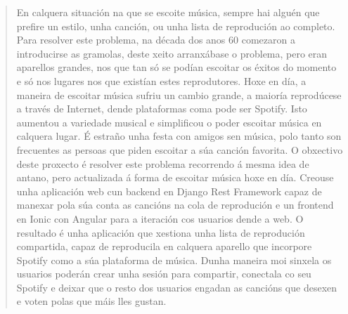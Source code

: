 
\begin{abstract}\thispagestyle{empty}
	En calquera situación na que se escoite música, sempre hai alguén que prefire un estilo, unha canción, ou unha lista de reprodución ao completo. Para resolver este problema, na década dos anos 60 comezaron a introducirse as gramolas, deste xeito arranxábase o problema, pero eran aparellos grandes, nos que tan só se podían escoitar os éxitos do momento e só nos lugares nos que existían estes reprodutores. Hoxe en día, a maneira de escoitar música sufriu un cambio grande, a maioría reprodúcese a través de Internet, dende plataformas coma pode ser Spotify. Isto aumentou a variedade musical e simplificou o poder escoitar música en calquera lugar. É estraño unha festa con amigos sen música, polo tanto son frecuentes as persoas que piden escoitar a súa canción favorita.\smallbreak
	O obxectivo deste proxecto é resolver este problema recorrendo á mesma idea de antano, pero actualizada á forma de escoitar música hoxe en día. Creouse unha aplicación web cun backend en Django Rest Framework capaz de manexar pola súa conta as cancións na cola de reprodución e un frontend en Ionic con Angular para a iteración cos usuarios dende a web.\smallbreak
	O resultado é unha aplicación que xestiona unha lista de reprodución compartida, capaz de reproducila en calquera aparello que incorpore Spotify como a súa plataforma de música. Dunha maneira moi sinxela os usuarios poderán crear unha sesión para compartir, conectala co seu Spotify e deixar que o resto dos usuarios engadan as cancións que desexen e voten polas que máis lles gustan.


\end{abstract}
